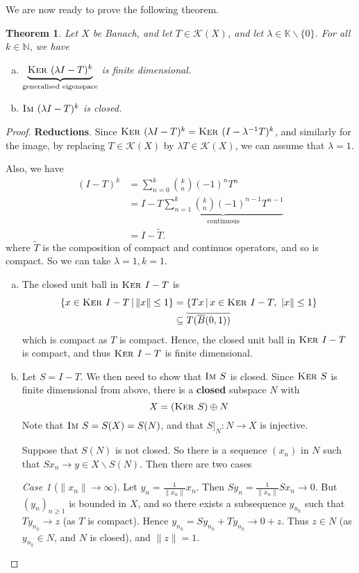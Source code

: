 \documentclass[10pt, oneside, reqno]{amsart}
\theoremstyle{plain}%
\newtheorem{thm}{Theorem}[section]
\theoremstyle{definition}
\theoremstyle{remark}
\newtheorem{case}{Case}
\newcommand{\given}{ \, | \,}
\newcommand{\K}{\mathbb{K}}
\newcommand{\N}{\mathbb{N}}
\newcommand{\im}{\textsc{Im\ }}
\renewcommand{\ker}{\textsc{Ker\ }}
\begin{document}
We are now ready to prove the following theorem.

\begin{thm}
	Let $X$ be Banach, and let $T \in \mathcal K(X)$, and let $\lambda \in \K \backslash \{ 0 \}$.  For all $k \in \N$, we have \begin{enumerate}[(a)]
		\item $\underbrace{\ker(\lambda I - T)^k}_{\text{generalised eigenspace}}$ is finite dimensional.
		\item $\im(\lambda I - T)^k$ is closed.   
	\end{enumerate}
\end{thm}
\begin{proof}
	\textbf{Reductions}.  Since $\ker(\lambda I - T)^k = \ker(I - \lambda^{-1}T)^k$, and similarly for the image, by replacing $T \in \mathcal K(X)$ by $\lambda T \in \mathcal K(X)$, we can assume that $\lambda = 1$.
	
	Also, we have \begin{align*}
		(I - T)^k 	&= \sum_{n=0}^k {k \choose n} (-1)^n T^n \\
					&= I - T \underbrace{\sum_{n = 1}^k {k \choose n} (-1)^{n-1} T^{n-1}}_\text{continuous}  \\
					&= I - \tilde T.
	\end{align*} where $\tilde T$ is the composition of compact and continuos operators, and so is compact.  So we can take $\lambda = 1, k = 1$.  
	
	\begin{enumerate}[(a)]
		\item The closed unit ball in $\ker I - T$ is \begin{align*}
		\{ x \in \ker I - T \given \| x \| \leq 1 \} &= \{ Tx \given x \in \ker I - T, \ | x \| \leq 1 \} \\
		&\subseteq \overline{T (\overline B(0, 1))}
		\end{align*} which is compact as $T$ is compact.  Hence, the closed unit ball in $\ker I - T$ is compact, and thus $\ker I - T$ is finite dimensional.
		\item Let $S = I - T$.  We then need to show that $\im S$ is closed.  Since $\ker S$ is finite dimensional from above, there is a \textbf{closed} subspace $N$ with \[
			X = (\ker S) \oplus N
		\]  Note that $\im S = S(X) = S(N)$, and that $S |_N : N \rightarrow X$ is injective. 
		
		Suppose that $S(N)$ is not closed.  So there is a sequence $(x_n)$ in $N$ such that $Sx_n \rightarrow y \in X \backslash S(N)$. Then there are two cases
		\begin{case}[$\| x_n \| \rightarrow \infty$]  Let $y_n = \frac{1}{\| x_n \|} x_n$.  Then $Sy_n = \frac{1}{\| x_n \|} S x_n \rightarrow 0$.  But $(y_n)_{ n \geq 1}$ is bounded in $X$, and so there exists a subsequence $y_{n_k}$ such that $T y_{n_k} \rightarrow z$ (as $T$ is compact).  Hence $y_{n_k} = S y_{n_k} + T y_{n_k} \rightarrow 0 + z$.  Thus $z \in N$ (as $y_{n_k} \in N$, and $N$ is closed), and $\| z \| = 1$.  
			

\end{case}
\end{enumerate}
\end{proof}
\end{document}
